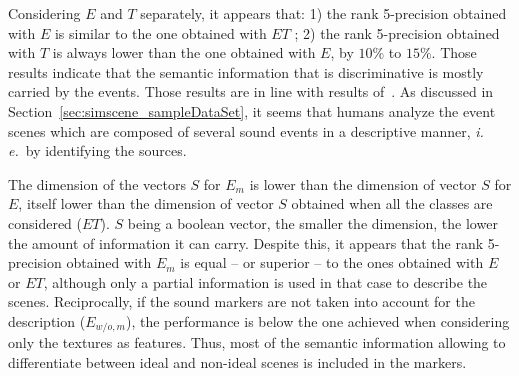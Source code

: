 \documentclass[12pt]{elsarticle}
\newcommand{\ie}{\emph{i.\,e.}}
\begin{document}
Considering $E$ and $T$ separately, it appears that: 1) the rank 5-precision obtained with $E$ is similar to the one obtained with $ET$ ; 2) the rank 5-precision obtained with $T$ is always lower than the one obtained with $E$, by $10\%$ to $15\%$. Those results indicate that the semantic information that is discriminative is mostly carried by the events. Those results are in line with results of~\cite{maffiolo_caracterisation_1999}. As discussed in Section~\ref{sec:simscene_sampleDataSet}, it seems that humans analyze the event scenes which are composed of several sound events in a descriptive manner, \ie~by identifying the sources.



The dimension of the vectors $S$ for $E_m$ is lower than the dimension of vector $S$ for $E$, itself lower than the dimension of vector $S$ obtained when all the classes are considered ($ET$). $S$ being a boolean vector, the smaller the dimension, the lower the amount of information it can carry. Despite this, it appears that the rank 5-precision obtained with $E_m$ is equal – or superior – to the ones obtained with $E$ or $ET$, although only a partial information is used in that case to describe the scenes. Reciprocally, if the sound markers are not taken into account for the description ($E_{w/o,m}$), the performance is below the one achieved when considering only the textures as features. Thus, most of the semantic information allowing to differentiate between ideal and non-ideal scenes is included in the markers.
\end{document}
